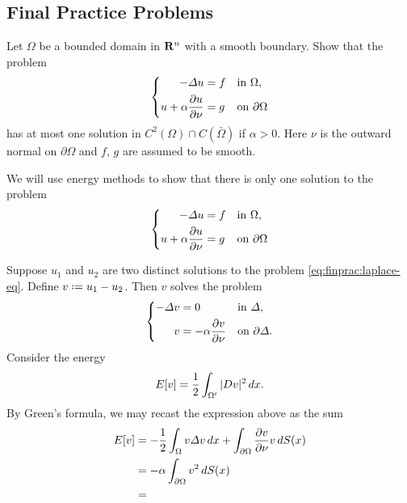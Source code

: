\subsection{Final Practice Problems}
\begin{problem}
  Let \(\Omega\) be a bounded domain in \(\mathbf{R}^n\) with a smooth
  boundary. Show that the problem
  \[
    \left\{
      \begin{aligned}
        -\Lap u&=f&&\text{in \(\Omega\),}\\
        u+\alpha\frac{\partial u}{\partial\nu}&=g&&\text{on \(\partial\Omega\)}
      \end{aligned}
    \right.
  \]
  has at most one solution in \(C^2(\Omega)\cap C(\bar\Omega)\) if
  \(\alpha>0\). Here \(\nu\) is the outward normal on \(\partial\Omega\)
  and \(f\), \(g\) are assumed to be smooth.
\end{problem}
\begin{solution*}
  We will use energy methods to show that there is only one solution to the
  problem
  \begin{equation}
    \label{eq:finprac:laplace-eq}
    \left\{
      \begin{aligned}
        -\Lap u&=f&&\text{in \(\Omega\),}\\
        u+\alpha\frac{\partial u}{\partial\nu}&=g&&\text{on \(\partial\Omega\)}
      \end{aligned}
    \right.
  \end{equation}

  Suppose \(u_1\) and \(u_2\) are two distinct solutions to the problem
  \eqref{eq:finprac:laplace-eq}. Define \(v\defeq u_1-u_2\). Then \(v\)
  solves the problem
  \[
    \left\{
      \begin{aligned}
        -\Lap v&=0&&\text{in \(\Delta\),}\\
        v&=-\alpha\frac{\partial v}{\partial\nu}&&\text{on \(\partial\Delta\).}
      \end{aligned}
    \right.
  \]
  Consider the energy
  \[
    E[v]=\frac{1}{2}\int_{\Omega'}|Dv|^2\diff x.
  \]
  By Green's formula, we may recast the expression above as the sum
  \begin{align*}
    E[v]
    &=-\frac{1}{2}\int_\Omega v\Lap v\diff x
      +\int_{\partial\Omega}\frac{\partial v}{\partial\nu }v\diff S(x)\\
    &=-\alpha\int_{\partial\Omega} v^2\diff S(x)\\
    &=
  \end{align*}
\end{solution*}


